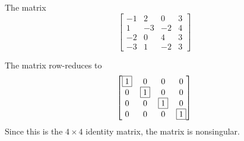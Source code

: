 \documentclass{ximera}
\author{Rob Beezer}
\begin{document}
\begin{exercise}
  The matrix
  \[
    \begin{bmatrix}
      -1 & 2 & 0 & 3 \\
      1 & -3 & -2 & 4 \\
      -2 & 0 & 4 & 3 \\
      -3 & 1 & -2 & 3
    \end{bmatrix}
  \]
  \begin{multipleChoice}
  \end{multipleChoice}

  \begin{feedback}[correct]
    The matrix row-reduces to
    \[
      \begin{bmatrix}
        \fbox{1} & 0 & 0 & 0 \\
        0 & \fbox{1} & 0 & 0 \\
        0 & 0 & \fbox{1} & 0 \\
        0 & 0 & 0 & \fbox{1}
      \end{bmatrix}
    \]
    Since this is the $4\times 4$ identity matrix, the matrix is nonsingular.
  \end{feedback}
\end{exercise}
\end{document}
